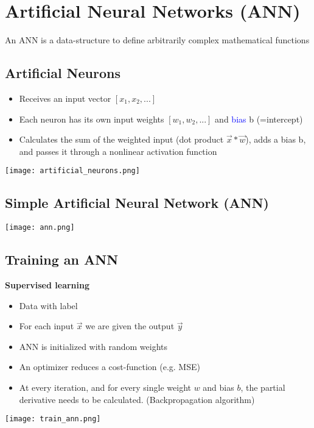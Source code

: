 
\section{Artificial Neural Networks (ANN)}
An ANN is a data-structure to define arbitrarily complex mathematical functions

\subsection{Artificial Neurons}
\begin{itemize}
    \item Receives an input vector $[x_1,x_2, ...]$
    \item Each neuron has its own input weights $[w_1, w_2, ...]$ and \textcolor{blue}{bias} b (=intercept)
    \item Calculates the sum of the weighted input (dot product $\vec{x} * \vec{w}$), adds a bias b, and passes it through a nonlinear activation function
\end{itemize}
\texttt{[image: artificial\_neurons.png]}

\subsection{Simple Artificial Neural Network (ANN)}
\texttt{[image: ann.png]}

\subsection{Training an ANN}
\textbf{Supervised learning}
\begin{itemize}
    \item Data with label
    \item For each input $\vec{x}$ we are given the output $\vec{y}$
    \item ANN is initialized with random weights
    \item An optimizer reduces a cost-function (e.g. MSE)
    \item At every iteration, and for every single weight $w$ and bias $b$, the partial derivative needs to be calculated. (Backpropagation algorithm)
\end{itemize}
\texttt{[image: train\_ann.png]}
